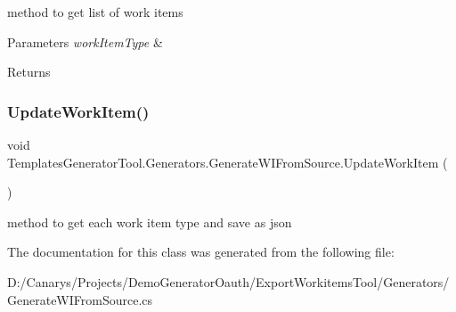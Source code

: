 method to get list of work items 


\begin{DoxyParams}{Parameters}
{\em work\+Item\+Type} & \\
\hline
\end{DoxyParams}
\begin{DoxyReturn}{Returns}

\end{DoxyReturn}
\mbox{\label{class_templates_generator_tool_1_1_generators_1_1_generate_w_i_from_source_afb867463d207db51a8653f14e809e392}} 
\subsubsection{\texorpdfstring{Update\+Work\+Item()}{UpdateWorkItem()}}
{\footnotesize\ttfamily void Templates\+Generator\+Tool.\+Generators.\+Generate\+W\+I\+From\+Source.\+Update\+Work\+Item (\begin{DoxyParamCaption}{ }\end{DoxyParamCaption})}



method to get each work item type and save as json 



The documentation for this class was generated from the following file\+:\begin{DoxyCompactItemize}
\item 
D\+:/\+Canarys/\+Projects/\+Demo\+Generator\+Oauth/\+Export\+Workitems\+Tool/\+Generators/Generate\+W\+I\+From\+Source.\+cs\end{DoxyCompactItemize}
